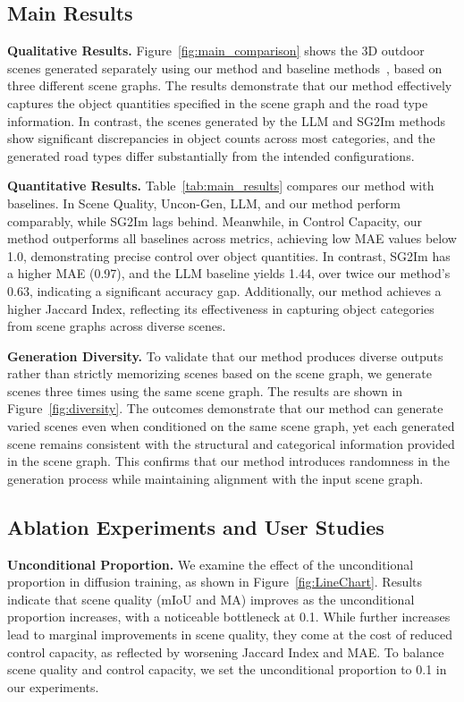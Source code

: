 \subsection{Main Results}

\textbf{Qualitative Results.} Figure~\ref{fig:main_comparison} shows the 3D outdoor scenes generated separately using our method and baseline methods~\cite{ye2024language, zhao2023graphtext}, based on three different scene graphs.
%
The results demonstrate that our method effectively captures the object quantities specified in the scene graph and the road type information. In contrast, the scenes generated by the LLM and SG2Im methods show significant discrepancies in object counts across most categories, and the generated road types differ substantially from the intended configurations. 
%

\noindent \textbf{Quantitative Results.}
Table~\ref{tab:main_results} compares our method with baselines. In Scene Quality, Uncon-Gen, LLM, and our method perform comparably, while SG2Im lags behind. Meanwhile, in Control Capacity, our method outperforms all baselines across metrics, achieving low MAE values below 1.0, demonstrating precise control over object quantities. In contrast, SG2Im has a higher MAE (0.97), and the LLM baseline yields 1.44, over twice our method’s 0.63, indicating a significant accuracy gap. Additionally, our method achieves a higher Jaccard Index, reflecting its effectiveness in capturing object categories from scene graphs across diverse scenes.

\noindent \textbf{Generation Diversity.} To validate that our method produces diverse outputs rather than strictly memorizing scenes 
%
based on the scene graph, we generate scenes three times using the same scene graph. The results are shown in Figure~\ref{fig:diversity}. The outcomes demonstrate that our method can generate varied scenes even when conditioned on the same scene graph, yet each generated scene remains consistent with the structural and categorical information provided in the scene graph. This confirms that our method introduces randomness in the generation process while maintaining alignment with the input scene graph.

\subsection{Ablation Experiments and User Studies}
\noindent \textbf{Unconditional Proportion.} We examine the effect of the unconditional proportion in diffusion training, as shown in Figure~\ref{fig:LineChart}. Results indicate that scene quality (mIoU and MA) improves as the unconditional proportion increases, with a noticeable bottleneck at 0.1. While further increases lead to marginal improvements in scene quality, they come at the cost of reduced control capacity, as reflected by worsening Jaccard Index and MAE. To balance scene quality and control capacity, we set the unconditional proportion to 0.1 in our experiments.

